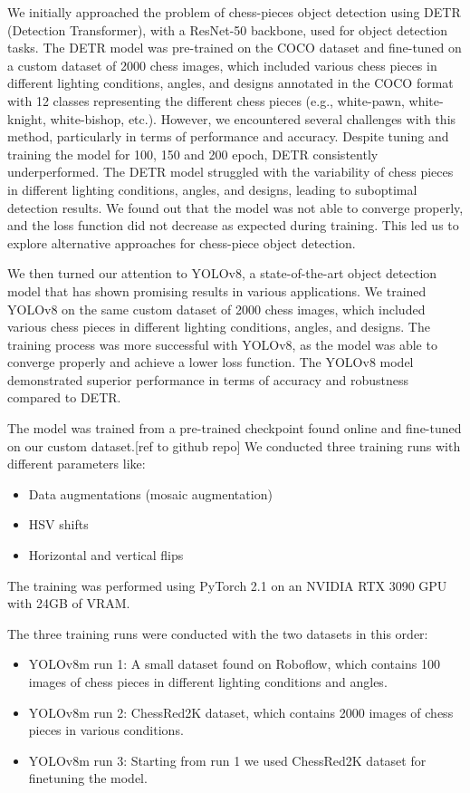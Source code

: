We initially approached the problem of chess-pieces object detection using DETR (Detection Transformer), with a ResNet-50 backbone, used for object detection tasks.
The DETR model was pre-trained on the COCO dataset and fine-tuned on a custom dataset of 2000 chess images, which included various chess pieces in different lighting conditions,
 angles, and designs annotated in the COCO format with 12 classes representing the different chess pieces (e.g., white-pawn, white-knight, white-bishop, etc.).
However, we encountered several challenges with this method, particularly in terms of performance and accuracy.
Despite tuning and training the model for 100, 150 and 200 epoch, DETR consistently underperformed.
The DETR model struggled with the variability of chess pieces in different lighting conditions, angles, and designs, leading to suboptimal detection results.
We found out that the model was not able to converge properly, and the loss function did not decrease as expected during training.
This led us to explore alternative approaches for chess-piece object detection.

We then turned our attention to YOLOv8, a state-of-the-art object detection model that has shown promising results in various applications.
We trained YOLOv8 on the same custom dataset of 2000 chess images, which included various chess pieces in different lighting conditions, angles, and designs.
The training process was more successful with YOLOv8, as the model was able to converge properly and achieve a lower loss function.
The YOLOv8 model demonstrated superior performance in terms of accuracy and robustness compared to DETR.

The model was trained from a pre-trained checkpoint found online and fine-tuned on our custom dataset.[ref to github repo]
We conducted three training runs with different parameters like:
\begin{itemize}
    \item Data augmentations (mosaic augmentation)
    \item HSV shifts
    \item Horizontal and vertical flips
\end{itemize}
The training was performed using PyTorch 2.1 on an NVIDIA RTX 3090 GPU with 24GB of VRAM.

The three training runs were conducted with the two datasets in this order:
\begin{itemize}
    \item YOLOv8m run 1: A small dataset found on Roboflow, which contains 100 images of chess pieces in different lighting conditions and angles.
    \item YOLOv8m run 2: ChessRed2K dataset, which contains 2000 images of chess pieces in various conditions.
    \item YOLOv8m run 3: Starting from run 1 we used ChessRed2K dataset for finetuning the model.
\end{itemize}

